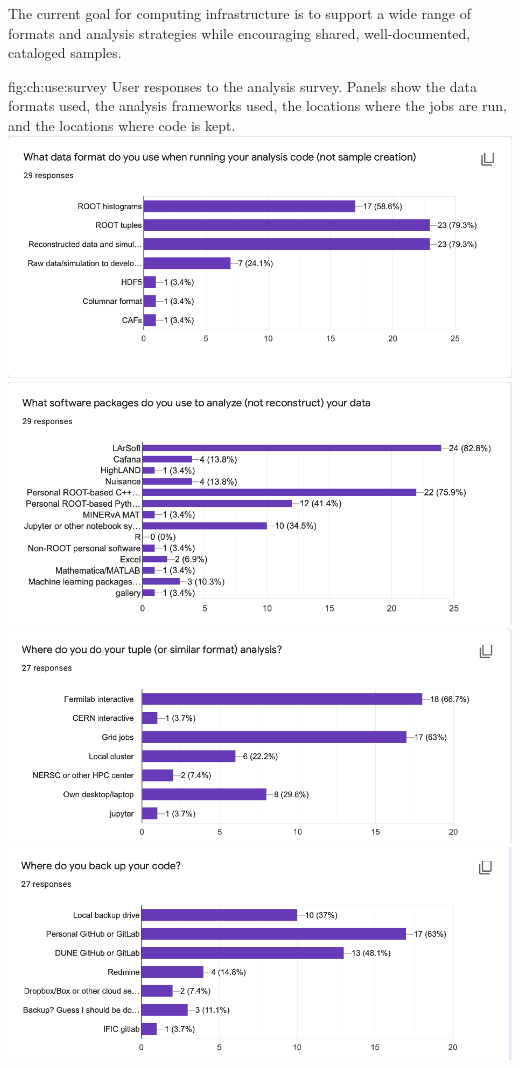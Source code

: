 \documentclass[../main-v1.tex]{subfiles}
\begin{document}
The current goal for computing infrastructure is to support a wide range of formats and analysis strategies while encouraging shared, well-documented, cataloged samples. 

\begin{dunefigure}
{fig:ch:use:survey}
 {User responses to the analysis survey. Panels show the data formats used, the analysis frameworks used, the locations where the jobs are run, and the locations where code is kept.}
\includegraphics[width=4 in]{graphics/Algo/SurveyFormat.png}
\includegraphics[width=4 in]{graphics/Algo/SurveyCode.png}
\includegraphics[width=4 in]{graphics/Algo/SurveySite.png}
\includegraphics[width=4 in]{graphics/Algo/SurveyRepo.png}
\end{dunefigure}
\end{document}
